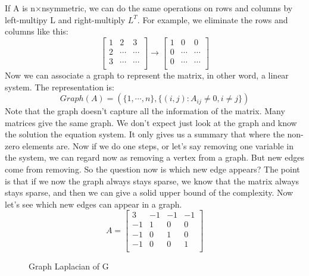 \documentclass{article}
\begin{document}
    
    If A is n$\times$nsymmetric, we can do the same operations on rows and columns by left-multipy L and right-multiply $L^T$. For example, we eliminate the rows and columns like this: 
    $$ \begin{bmatrix}
    1 & 2 & 3 \\
    2 & \cdots & \cdots  \\
    3 & \cdots & \cdots  \\
    \end{bmatrix}
    \longrightarrow
    \begin{bmatrix}
    1 & 0 & 0 \\
    0 & \cdots & \cdots  \\
    0 & \cdots & \cdots  \\
    \end{bmatrix}
     $$
     Now we can associate a graph to represent the matrix, in other word, a linear system. The representation is:
     \[
     Graph(A)=(\{1, \cdots, n\},\{(i, j):A_{ij}\neq0, i \neq j \})
     \]
     Note that the graph doesn't capture all the information of the matrix. Many matrices give the same graph. We don't expect just look at the graph and know the solution the equation system. It only gives us a summary that where the non-zero elements are.
    Now if we do one steps, or let's say removing one variable in the system, we can regard now as removing a vertex from a graph. But new edges come from removing. So the question now is which new edge appears? The point is that if we now the graph always stays sparse, we know that the matrix always stays sparse, and then we can give a solid upper bound of the complexity. Now let's see which new edges can appear in a graph.
    $$A = \begin{bmatrix}
    3 & -1 & -1 & -1 \\
    -1 & 1 & 0 & 0 \\
    -1 & 0 & 1 & 0 \\
    -1 & 0 & 0 & 1 \\
    \end{bmatrix}$$
    \begin{figure}[h!]
    	\begin{center}
    	\end{center}
    	\caption{Graph Laplacian of G}
    \end{figure}
\end{document}
